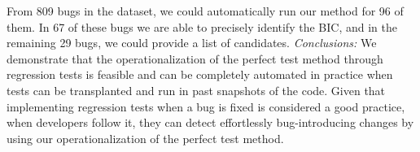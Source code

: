 From 809 bugs in the dataset, we could automatically run our method for 96 of them. 
In 67 of these bugs we are able to precisely identify the BIC, and in the remaining 29 bugs, we could provide a list of candidates.
\textit{Conclusions:} 
We demonstrate that the operationalization of the perfect test method through regression tests is feasible and can be completely automated in practice when tests can be transplanted and run in past snapshots of the code. Given that implementing regression tests when a bug is fixed is considered a good practice, when developers follow it, they can detect effortlessly bug-introducing changes by using our operationalization of the perfect test method.

